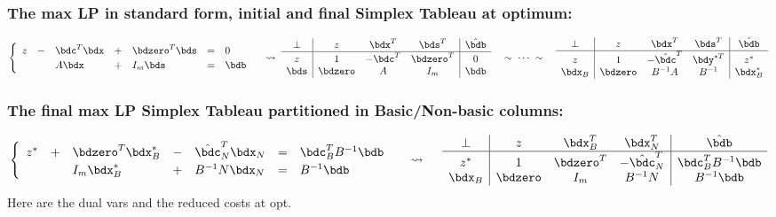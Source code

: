 \documentclass[a4paper]{article}
\begin{document}
\subsubsection*{The max LP in standard form, initial and final Simplex Tableau at optimum:}%
\[
  \begin{cases}
    \begin{array}[m]{*{5}{lc}}
    z &-& \bdc^T\bdx &+& \bdzero^T\bds &=&  0   \cr
      & &   A\bdx    &+&   I_m\bds     &=& \bdb \cr
    \end{array}
  \end{cases}
  \rightsquigarrow\;
    \begin{array}[m]{c|ccc|c}
 \perp &     z   & \bdx^T & \bds^T     & \hat\bdb \cr\hline\rule{0pt}{10pt}
    z  &     1   &-\bdc^T & \bdzero^T  &   0    \cr %
 \bds  & \bdzero & A      & I_m        & \bdb   \cr
    \end{array}
  \quad\sim\;\cdots\;\sim\quad
    \begin{array}[m]{c|ccc|c}
 \perp &     z   &     \bdx^T &     \bds^T   & \hat\bdb \cr\hline\rule{0pt}{10pt}
 z  &     1   &-\hat\bdc^T &     \bdy^{*T} & z^*\cr %
 \bdx_B& \bdzero &     B^{-1}A&     B^{-1}   & \bdx_B^*   \cr
    \end{array}
\]

\subsubsection*{The final max LP Simplex Tableau partitioned in Basic/Non-basic columns:}%
\[
  \begin{cases}
    \begin{array}[m]{*{5}{lc}}
      z^* &+& \bdzero^T\bdx_B^* &-& \hat\bdc_N^T\bdx_N &=&  \bdc_B^TB^{-1}\bdb \cr
      & &    I_m\bdx_B^*  &+& B^{-1}N\bdx_N     &=& B^{-1}\bdb \cr
    \end{array}
  \end{cases}
  \;\rightsquigarrow\quad\;
    \begin{array}[m]{c|ccc|c}
   \perp &     z   & \bdx_B^T  & \bdx_N^T & \hat\bdb \cr\hline\rule{0pt}{10pt}
      z^*&     1   & \bdzero^T &-\hat\bdc_N^T & \bdc_B^TB^{-1}\bdb \cr %
  \bdx_B & \bdzero &  I_m  & B^{-1}N      &  B^{-1}\bdb   \cr
    \end{array}
\]
Here  are the dual vars and
 the reduced costs at opt.
\end{document}
